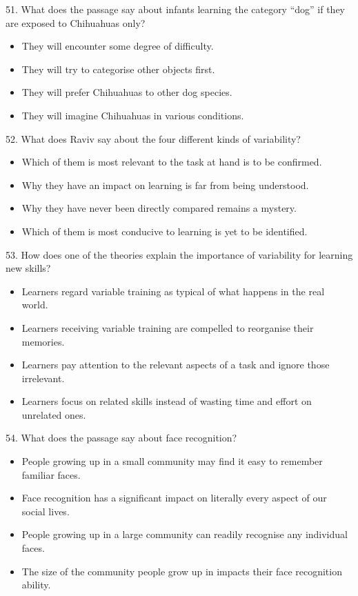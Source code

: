 \documentclass[UTF8,11pt]{ctexart}
\begin{document}
51. What does the passage say about infants learning the category “dog” if they are exposed to Chihuahuas only?


\begin{itemize}[leftmargin=2em,itemsep=.2em,topsep=.4em]\item[A.] They will encounter some degree of difficulty.
\item[B.] They will try to categorise other objects first.
\item[C.] They will prefer Chihuahuas to other dog species.
\item[D.] They will imagine Chihuahuas in various conditions.
\end{itemize}

52. What does Raviv say about the four different kinds of variability?


\begin{itemize}[leftmargin=2em,itemsep=.2em,topsep=.4em]\item[A.] Which of them is most relevant to the task at hand is to be confirmed.
\item[B.] Why they have an impact on learning is far from being understood.
\item[C.] Why they have never been directly compared remains a mystery.
\item[D.] Which of them is most conducive to learning is yet to be identified.
\end{itemize}

53. How does one of the theories explain the importance of variability for learning new skills?


\begin{itemize}[leftmargin=2em,itemsep=.2em,topsep=.4em]\item[A.] Learners regard variable training as typical of what happens in the real world.
\item[B.] Learners receiving variable training are compelled to reorganise their memories.
\item[C.] Learners pay attention to the relevant aspects of a task and ignore those irrelevant.
\item[D.] Learners focus on related skills instead of wasting time and effort on unrelated ones.
\end{itemize}

54. What does the passage say about face recognition?


\begin{itemize}[leftmargin=2em,itemsep=.2em,topsep=.4em]\item[A.] People growing up in a small community may find it easy to remember familiar faces.
\item[B.] Face recognition has a significant impact on literally every aspect of our social lives.
\item[C.] People growing up in a large community can readily recognise any individual faces.
\item[D.] The size of the community people grow up in impacts their face recognition ability.
\end{itemize}
\end{document}

